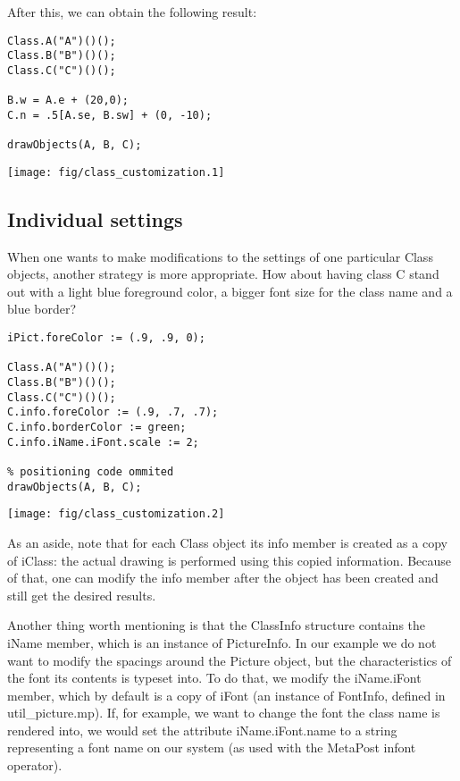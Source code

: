 \documentclass{article}
\newcommand{\code}{\ttfamily}
\begin{document}
After this, we can obtain the following result:

\begin{multicols}{2}
\begin{verbatim}
Class.A("A")()();
Class.B("B")()();
Class.C("C")()();

B.w = A.e + (20,0);
C.n = .5[A.se, B.sw] + (0, -10);

drawObjects(A, B, C);
\end{verbatim}
\columnbreak
\hspace{1cm}\texttt{[image: fig/class\_customization.1]}
\end{multicols}

\subsection{Individual settings}

When one wants to make modifications to the settings of one particular
{\code Class} objects, another strategy is more appropriate. How about having class
{\code C} stand out with a light blue foreground color, a bigger font size for the class name and a blue border?

\begin{multicols}{2}
\begin{verbatim}
iPict.foreColor := (.9, .9, 0);

Class.A("A")()();
Class.B("B")()();
Class.C("C")()();
C.info.foreColor := (.9, .7, .7);
C.info.borderColor := green;
C.info.iName.iFont.scale := 2;

% positioning code ommited
drawObjects(A, B, C);
\end{verbatim}
\columnbreak
\hspace{1cm}\texttt{[image: fig/class\_customization.2]}
\end{multicols}

As an aside, note that for each {\code Class} object its {\code info} member is created as
a copy of {\code iClass}: the actual drawing is performed using this copied
information. Because of that, one can modify the {\code info} member after the object
has been created and still get the desired results.

Another thing worth mentioning is that the {\code ClassInfo} structure contains
the {\code iName} member, which is an instance of {\code PictureInfo}. In our example we
do not want to modify the spacings around the {\code Picture} object,
but the characteristics of the font its contents is typeset into. To do that,
we modify the {\code iName.iFont} member, which by default is a copy of {\code iFont}
(an instance of {\code FontInfo}, defined in {\code util\_picture.mp}).
If, for example, we want to change the font the class name is rendered into, we would set
the attribute {\code iName.iFont.name} to a string representing a font name
on our system (as used with the MetaPost {\code infont} operator).
\end{document}
